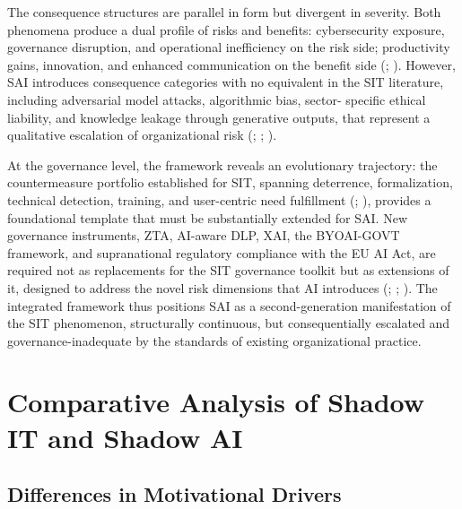 \documentclass[12pt,oneside]{article}
\begin{document}
The consequence structures are parallel in form but divergent in severity. Both phenomena produce a dual profile of risks and benefits: cybersecurity exposure, governance disruption, and operational inefficiency on the risk side; productivity gains, innovation, and enhanced communication on the benefit side (\citealp[13]{mallmann2018weare}; \citealp[1]{ross2025shadowai}). However, \ac{SAI} introduces consequence categories with no equivalent in the \ac{SIT} literature, including adversarial model attacks, algorithmic bias, sector- specific ethical liability, and knowledge leakage through generative outputs, that represent a qualitative escalation of organizational risk (\citealp[973]{puthal2025shadowai}; \citealp[3]{balogun2025ethical}; \citealp[1]{chin2025conflicting}).

At the governance level, the framework reveals an evolutionary trajectory: the  countermeasure portfolio established for \ac{SIT}, spanning deterrence, formalization, technical detection, training, and user-centric need fulfillment (\citealp[150-151]{rakovic2020shadow}; \citealp[8-9]{gyoery2012exploring}), provides a foundational template that must be substantially extended for \ac{SAI}. New governance instruments, \ac{ZTA}, \ac{AI}-aware \ac{DLP}, \ac{XAI}, the \ac{BYOAI}-GOVT framework, and supranational regulatory compliance with the EU \ac{AI} Act, are required not as replacements for the \ac{SIT} governance toolkit but as extensions of it, designed to address the novel risk dimensions that \ac{AI} introduces (\citealp[144]{rakovic2020shadow}; \citealp[9623]{anthuvan2025byoai}; \citealp[7]{balogun2025ethical}). The integrated framework thus positions \ac{SAI} as a second-generation manifestation of the \ac{SIT} phenomenon, structurally continuous, but consequentially escalated and governance-inadequate by the standards of existing organizational practice.

\section{Comparative Analysis of Shadow IT and Shadow AI} \label{comparative-analysis}

\subsection{Differences in Motivational Drivers} \label{differences-in-motivational-drivers}
\end{document}
